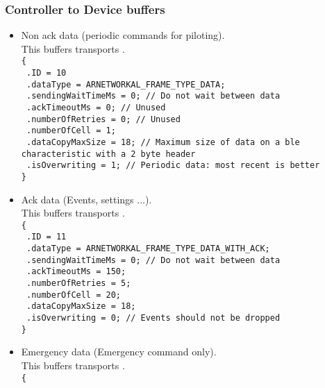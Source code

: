 \subsubsection*{Controller to Device buffers}
\begin{itemize}
\item{
    Non ack data (periodic commands for piloting).\\
    This buffers transports .\\
    \texttt{\{}\\
    \texttt{  .ID = 10}\\
    \texttt{  .dataType = ARNETWORKAL\_FRAME\_TYPE\_DATA;}\\
    \texttt{  .sendingWaitTimeMs = 0; // Do not wait between data}\\
    \texttt{  .ackTimeoutMs = 0; // Unused}\\
    \texttt{  .numberOfRetries = 0; // Unused}\\
    \texttt{  .numberOfCell = 1;}\\
    \texttt{  .dataCopyMaxSize = 18; // Maximum size of data on a ble characteristic with a 2 byte header}\\
    \texttt{  .isOverwriting = 1; // Periodic data: most recent is better}\\
    \texttt{\}}
  }
\item{
    Ack data (Events, settings ...).\\
    This buffers transports .\\
    \texttt{\{}\\
    \texttt{  .ID = 11}\\
    \texttt{  .dataType = ARNETWORKAL\_FRAME\_TYPE\_DATA\_WITH\_ACK;}\\
    \texttt{  .sendingWaitTimeMs = 0; // Do not wait between data}\\
    \texttt{  .ackTimeoutMs = 150;}\\
    \texttt{  .numberOfRetries = 5;}\\
    \texttt{  .numberOfCell = 20;}\\
    \texttt{  .dataCopyMaxSize = 18;}\\
    \texttt{  .isOverwriting = 0; // Events should not be dropped}\\
    \texttt{\}}
}
\item{
    Emergency data (Emergency command only).\\
    This buffers transports .\\
    \texttt{\{}\\
}
\end{itemize}
